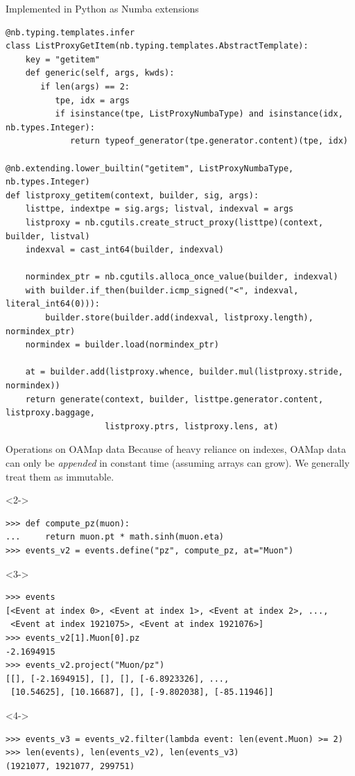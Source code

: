 \documentclass[aspectratio=169]{beamer}
\begin{document}
\begin{frame}[fragile]{Implemented in Python as Numba extensions}
\vspace{0.15 cm}
\scriptsize
\begin{verbatim}
@nb.typing.templates.infer
class ListProxyGetItem(nb.typing.templates.AbstractTemplate):
    key = "getitem"
    def generic(self, args, kwds):
       if len(args) == 2:
          tpe, idx = args
          if isinstance(tpe, ListProxyNumbaType) and isinstance(idx, nb.types.Integer):
             return typeof_generator(tpe.generator.content)(tpe, idx)

@nb.extending.lower_builtin("getitem", ListProxyNumbaType, nb.types.Integer)
def listproxy_getitem(context, builder, sig, args):
    listtpe, indextpe = sig.args; listval, indexval = args
    listproxy = nb.cgutils.create_struct_proxy(listtpe)(context, builder, listval)
    indexval = cast_int64(builder, indexval)

    normindex_ptr = nb.cgutils.alloca_once_value(builder, indexval)
    with builder.if_then(builder.icmp_signed("<", indexval, literal_int64(0))):
        builder.store(builder.add(indexval, listproxy.length), normindex_ptr)
    normindex = builder.load(normindex_ptr)

    at = builder.add(listproxy.whence, builder.mul(listproxy.stride, normindex))
    return generate(context, builder, listtpe.generator.content, listproxy.baggage,
                    listproxy.ptrs, listproxy.lens, at)
\end{verbatim}
\end{frame}

\begin{frame}[fragile]{Operations on OAMap data}
\vspace{0.3 cm}
Because of heavy reliance on indexes, OAMap data can only be {\it appended} in constant time (assuming arrays can grow). We generally treat them as immutable.

\small
\begin{uncoverenv}<2->
\begin{verbatim}
>>> def compute_pz(muon):
...     return muon.pt * math.sinh(muon.eta)
>>> events_v2 = events.define("pz", compute_pz, at="Muon")
\end{verbatim}
\end{uncoverenv}
\begin{uncoverenv}<3->
\begin{verbatim}
>>> events
[<Event at index 0>, <Event at index 1>, <Event at index 2>, ...,
 <Event at index 1921075>, <Event at index 1921076>]
>>> events_v2[1].Muon[0].pz
-2.1694915
>>> events_v2.project("Muon/pz")
[[], [-2.1694915], [], [], [-6.8923326], ...,
 [10.54625], [10.16687], [], [-9.802038], [-85.11946]]
\end{verbatim}
\end{uncoverenv}
\begin{uncoverenv}<4->
\begin{verbatim}
>>> events_v3 = events_v2.filter(lambda event: len(event.Muon) >= 2)
>>> len(events), len(events_v2), len(events_v3)
(1921077, 1921077, 299751)
\end{verbatim}
\end{uncoverenv}
\end{frame}
\end{document}
